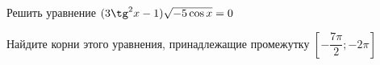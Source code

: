 \begin{ex}
	\begin{condition}
		\begin{enumcols}[label=\asbuk*)]
			\item Решить уравнение \( (3\tg^2x-1)\sqrt{-5\cos x}=0 \)
			\item Найдите корни этого уравнения, принадлежащие промежутку \( \left[ -\dfrac{7\pi}{2};-2\pi \right] \)
		\end{enumcols}
	\end{condition}
\end{ex}